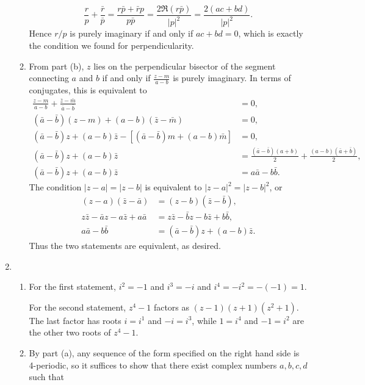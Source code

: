 \begin{enumerate}
\begin{enumerate}
\begin{equation*}
\frac{r}{p} + \frac{\bar{r}}{\bar{p}} = \frac{r\bar{p} + \bar{r}p}{p\bar{p}} = \frac{2\Re(r\bar{p})}{\lvert p\rvert^2} = \frac{2(ac + bd)}{\lvert p\rvert^2}.
\end{equation*}
Hence $r/p$ is purely imaginary if and only if $ac + bd = 0$, which is exactly the condition we found for perpendicularity.
\item From part (b), $z$ lies on the perpendicular bisector of the segment connecting $a$ and $b$ if and only if $\frac{z - m}{a - b}$ is purely imaginary. In terms of conjugates, this is equivalent to
\begin{align*}
\frac{z - m}{a - b} + \frac{\bar{z} - \bar{m}}{\bar{a} - \bar{b}} &= 0, \\
(\bar{a} - \bar{b})(z - m) + (a - b)(\bar{z} - \bar{m}) &= 0, \\
(\bar{a} - \bar{b})z + (a - b)\bar{z} - [(\bar{a} - \bar{b})m + (a - b)\bar{m}] &= 0, \\
(\bar{a} - \bar{b})z + (a - b)\bar{z} &= \frac{(\bar{a} - \bar{b})(a + b)}{2} + \frac{(a - b)(\bar{a} + \bar{b})}{2}, \\
(\bar{a} - \bar{b})z + (a - b)\bar{z} &= a\bar{a} - b\bar{b}.
\end{align*}
The condition $\lvert z - a\rvert = \lvert z - b\rvert$ is equivalent to $\lvert z - a\rvert^2 = \lvert z - b\rvert^2$, or
\begin{align*}
(z - a)(\bar{z} - \bar{a}) &= (z - b)(\bar{z} - \bar{b}), \\
z\bar{z} - \bar{a}z - a\bar{z} + a\bar{a} &= z\bar{z} - \bar{b}z - b\bar{z} + b\bar{b}, \\
a\bar{a} - b\bar{b} &= (\bar{a} - \bar{b})z + (a - b)\bar{z}.
\end{align*}
Thus the two statements are equivalent, as desired.
\end{enumerate}
\item \begin{enumerate}
\item For the first statement, $i^2 = -1$ and $i^3 = -i$ and $i^4 = -i^2 = -(-1) = 1$.\par
For the second statement, $z^4 - 1$ factors as $(z - 1)(z + 1)(z^2 + 1)$. The last factor has roots $i = i^1$ and $-i = i^3$, while $1 = i^4$ and $-1 = i^2$ are the other two roots of $z^4 - 1$.
\item By part (a), any sequence of the form specified on the right hand side is 4-periodic, so it suffices to show that there exist complex numbers $a, b, c, d$ such that

\end{enumerate}
\end{enumerate}
